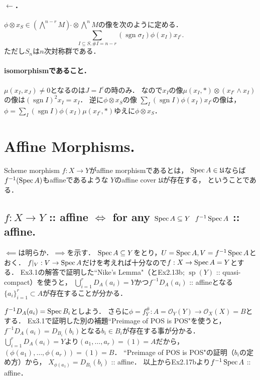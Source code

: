 \documentclass[a4paper]{jsarticle}
\newcommand{\shO}{\mathcal{O}}
\newcommand{\basesp}{\operatorname{sp}}
\newcommand{\coverU}{\mathfrak{U}}
\newcommand{\sidecheck}{\,\check{}}
\DeclareMathOperator{\sgn}{sgn}
\begin{document}
    \paragraph{$\leftarrow$．}
    $\phi \otimes x_S \in (\bigwedge^{n-r} M)\sidecheck \otimes \bigwedge^n M$の像を次のように定める．
    \[ \sum_{I \subseteq S, \#I=n-r} (\sgn \sigma_I) \phi(x_I)x_{I^c}. \]
    ただし$S_n$は$n$次対称群である．

    \paragraph{isomorphismであること．}
    $\mu(x_I, x_J) \neq 0$となるのは$J=I^c$の時のみ．
    なので$x_I$の像$\mu(x_I,*) \otimes (x_{I^c} \wedge x_I)$の像は$(\sgn I)^2 x_I=x_I$．
    逆に$\phi \otimes x_S$の像
    $\sum_I (\sgn I) \phi(x_I)x_{I^c}$の像は，
    $\phi=\sum_I (\sgn I) \phi(x_I)\mu(x_{I^c}, *)$ゆえに$\phi \otimes x_S$．

\section{Affine Morphisms.} %
    Scheme morphism $f: X \to Y$がaffine morphismであるとは，
    $\Spec A \in \coverU$ならば$f^{-1}(\operatorname{Spec} A)$もaffineであるような
    $Y$のaffine cover $\coverU$が存在する，
    ということである．

    \subsection{$f: X \to Y$ :: affine $\iff$ for any $\operatorname{Spec} A \subseteq Y$ $f^{-1}\operatorname{Spec} A$ :: affine.}
    $\impliedby$は明らか．$\implies$を示す．
    $\operatorname{Spec} A \subseteq Y$をとり，$U=\operatorname{Spec} A, V=f^{-1} \operatorname{Spec} A$とおく．
    $f|_V: V \to \operatorname{Spec} A$だけを考えれば十分なので$f: X \to \operatorname{Spec} A=Y$とする．
    Ex3.1の解答で証明した``Nike’s Lemma"（とEx2.13b; $\basesp(Y)$ :: quasi-compact）を使うと，
    $\bigcup_{i=1}^r D_A(a_i)=Y$かつ$f^{-1} D_A(a_i)$ :: affineとなる
    $\{a_i\}_{i=1}^r \subset A$が存在することが分かる．

    $f^{-1} D_A(a_i)=\operatorname{Spec} B_i$としよう．
    さらに$\phi=f^{\#}_Y: A=\shO_Y(Y) \to \shO_X(X)=B$とする．
    Ex3.1で証明した別の補題``Preimage of POS is POS"を使うと，
    $f^{-1} D_A(a_i)=D_{B_i}(b_i)$となる$b_i \in B_i$が存在する事が分かる．
    $\bigcup_{i=1}^r D_A(a_i)=Y$より$(a_1,\dots,a_r)=(1)=A$だから，
    $(\phi(a_1), \dots,\phi(a_r))=(1)=B$．
    ``Preimage of POS is POS"の証明（$b_i$の定め方）から，
    $X_{\phi(a_1)}=D_{B_i}(b_i)$ :: affine．
    以上からEx2.17bより$f^{-1}\operatorname{Spec} A$ :: affine．
\end{document}
